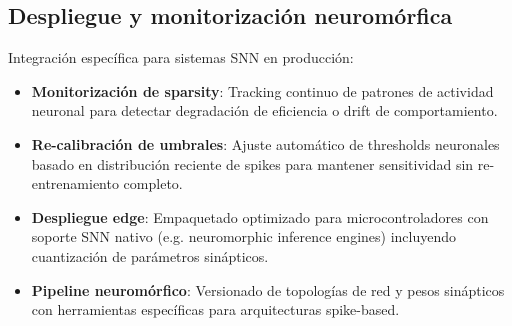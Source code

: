 \subsection{Despliegue y monitorización neuromórfica}
Integración específica para sistemas SNN en producción:
\begin{itemize}
    \item \textbf{Monitorización de sparsity}: Tracking continuo de patrones de actividad neuronal para detectar degradación de eficiencia o drift de comportamiento.
    \item \textbf{Re-calibración de umbrales}: Ajuste automático de thresholds neuronales basado en distribución reciente de spikes para mantener sensitividad sin re-entrenamiento completo.
    \item \textbf{Despliegue edge}: Empaquetado optimizado para microcontroladores con soporte SNN nativo (e.g. neuromorphic inference engines) incluyendo cuantización de parámetros sinápticos.
    \item \textbf{Pipeline neuromórfico}: Versionado de topologías de red y pesos sinápticos con herramientas específicas para arquitecturas spike-based.
\end{itemize}

